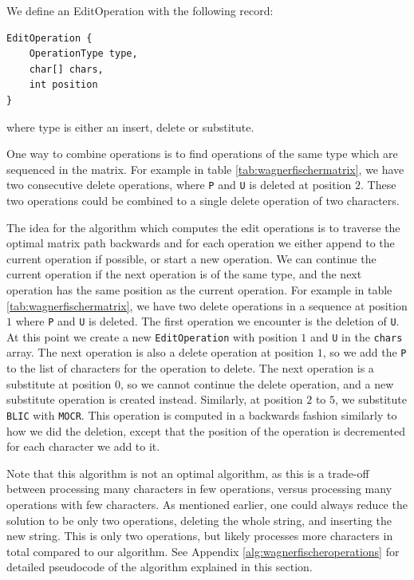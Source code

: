 We define an EditOperation with the following record:

\begin{lstlisting}
EditOperation {
    OperationType type,
    char[] chars,
    int position
}
\end{lstlisting}

where type is either an insert, delete or substitute.

One way to combine operations is to find operations of the same type which are sequenced
in the matrix. For example in table \ref{tab:wagnerfischermatrix}, we have two consecutive
delete operations, where \verb|P| and \verb|U| is deleted at position $2$. These two
operations could be combined to a single delete operation of two characters.

The idea for the algorithm which computes the edit operations is to traverse the optimal
matrix path backwards and for each operation we either append to the current operation if
possible, or start a new operation. We can continue the current operation if the next
operation is of the same type, and the next operation has the same position as the current
operation. For example in table \ref{tab:wagnerfischermatrix}, we have two delete
operations in a sequence at position $1$ where \verb|P| and \verb|U| is deleted. The first
operation we encounter is the deletion of \verb|U|. At this point we create a new
\verb|EditOperation| with position $1$ and \verb|U| in the \verb|chars| array. The next
operation is also a delete operation at position $1$, so we add the \verb|P| to the list
of characters for the operation to delete. The next operation is a substitute at position
$0$, so we cannot continue the delete operation, and a new substitute operation is created
instead. Similarly, at position $2$ to $5$, we substitute \verb|BLIC| with \verb|MOCR|.
This operation is computed in a backwards fashion similarly to how we did the deletion,
except that the position of the operation is decremented for each character we add to it.

Note that this algorithm is not an optimal algorithm, as this is a trade-off between
processing many characters in few operations, versus processing many operations with few
characters. As mentioned earlier, one could always reduce the solution to be only two
operations, deleting the whole string, and inserting the new string. This is only two
operations, but likely processes more characters in total compared to our algorithm. See
Appendix \ref{alg:wagnerfischeroperations} for detailed pseudocode of the algorithm
explained in this section.

